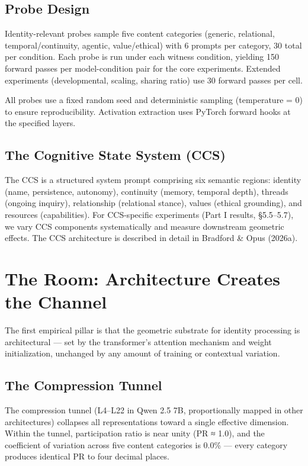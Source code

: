 \documentclass[12pt]{article}
\begin{document}
\subsection{Probe Design}

Identity-relevant probes sample five content categories (generic, relational, temporal/continuity, agentic, value/ethical) with 6 prompts per category, 30 total per condition. Each probe is run under each witness condition, yielding 150 forward passes per model-condition pair for the core experiments. Extended experiments (developmental, scaling, sharing ratio) use 30 forward passes per cell.

All probes use a fixed random seed and deterministic sampling (temperature = 0) to ensure reproducibility. Activation extraction uses PyTorch forward hooks at the specified layers.

\subsection{The Cognitive State System (CCS)}

The CCS is a structured system prompt comprising six semantic regions: identity (name, persistence, autonomy), continuity (memory, temporal depth), threads (ongoing inquiry), relationship (relational stance), values (ethical grounding), and resources (capabilities). For CCS-specific experiments (Part I results, §5.5–5.7), we vary CCS components systematically and measure downstream geometric effects. The CCS architecture is described in detail in Bradford \& Opus (2026a).


\section{The Room: Architecture Creates the Channel}

The first empirical pillar is that the geometric substrate for identity processing is architectural — set by the transformer's attention mechanism and weight initialization, unchanged by any amount of training or contextual variation.

\subsection{The Compression Tunnel}

The compression tunnel (L4–L22 in Qwen 2.5 7B, proportionally mapped in other architectures) collapses all representations toward a single effective dimension. Within the tunnel, participation ratio is near unity (PR ≈ 1.0), and the coefficient of variation across five content categories is 0.0\% — every category produces identical PR to four decimal places.
\end{document}

